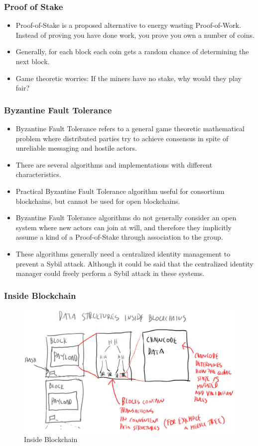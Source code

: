 \documentclass[8pt]{beamer}
\begin{document}
\begin{frame}
\frametitle{Proof of Stake}

\begin{itemize}
 \item Proof-of-Stake is a proposed alternative to energy wasting Proof-of-Work. Instead of proving you have done work, you prove you own a number of coins.
 \item Generally, for each block each coin gets a random chance of determining the next block.
 \item Game theoretic worries: If the miners have no stake, why would they play fair?
\end{itemize}

\end{frame}

\begin{frame}
\frametitle{Byzantine Fault Tolerance}
\begin{itemize}
 \item Byzantine Fault Tolerance refers to a general game theoretic mathematical problem where distributed parties try to achieve consensus in spite of unreliable messaging and hostile actors.
 \item There are several algorithms and implementations with different characteristics.
 \item Practical Byzantine Fault Tolerance algorithm useful for consortium blockchains, but cannot be used for open blockchains.
 \item Byzantine Fault Tolerance algorithms do not generally consider an open system where new actors can join at will, and therefore they implicitly assume a kind of a Proof-of-Stake through association to the group.
 \item These algorithms generally need a centralized identity management to prevent a Sybil attack. Although it could be said that the centralized identity manager could freely perform a Sybil attack in these systems.
\end{itemize}

\end{frame}

\begin{frame}
\frametitle{Inside Blockchain}

\begin{figure}[tb]
 \centering
 \includegraphics[width=8 cm,keepaspectratio=true]{./blockchain_images/inside_blockchains.png}
 \caption{Inside Blockchain}
\end{figure}

\end{frame}
\end{document}
